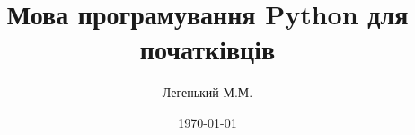 



\usepackage{cmap}					%
\usepackage{mathtext} 				%
\usepackage[T2A]{fontenc}			%
\usepackage[english,ukrainian]{babel}	%
\usepackage{amsmath}
\usepackage{amsfonts}
\usepackage{amssymb}

\usepackage{hyperref}

\usepackage{graphicx}  %
\graphicspath{{images/}{images2/}}  %
\setlength\fboxsep{3pt} %
\setlength\fboxrule{1pt} %
\usepackage{wrapfig} %

\usepackage{array,tabularx,tabulary,booktabs} %
\usepackage{longtable}  %
\usepackage{multirow} %

\usepackage{etoolbox} %

\usepackage{lastpage} %
\usepackage{soul} %
\usepackage{csquotes} %
\usepackage{multicol} %

\usepackage{tikz} %
\usepackage{pgfplots}
\usepackage{pgfplotstable}

\title[Python]{Мова програмування Python для початківців}
\author{Легенький М.М.}
\date{\today}

